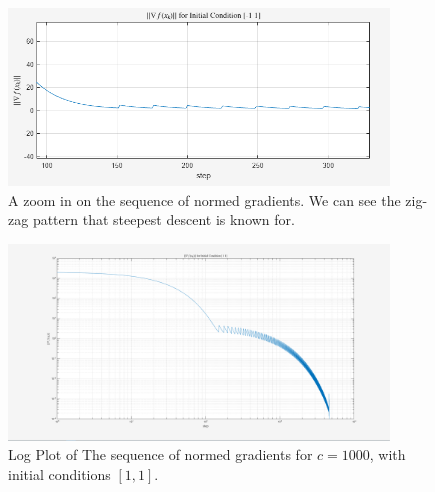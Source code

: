 \begin{figure}
    \centering
    \includegraphics[width = 0.9\textwidth]{Plots/NormGradient1000_zoomin.png}
    \caption{A zoom in on the sequence of normed gradients. We can see the zig-zag pattern that steepest descent is known for.}
    \label{fig:Zoomin}
\end{figure}

\begin{figure}
    \centering
    \includegraphics[width = 0.9\textwidth]{Plots/loglogc_1000.png}
    \caption{Log Plot of The sequence of normed gradients for $c = 1000$, with initial conditions $[1, 1]$.}
    \label{fig:loglog}
\end{figure}
